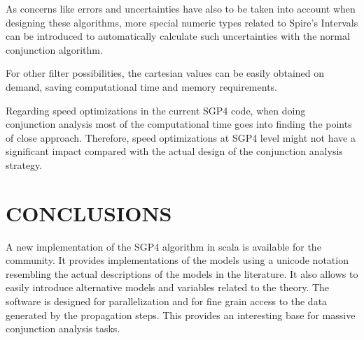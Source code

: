 \documentclass{article}
\begin{document}
As concerns like errors and uncertainties have also to be taken into account when designing these
algorithms, more special numeric types related to Spire's Intervals can be introduced to automatically
calculate such uncertainties with the normal conjunction algorithm.

For other filter possibilities, the cartesian values can be easily obtained on demand, saving computational time and memory requirements.

Regarding speed optimizations in the current SGP4 code, when doing conjunction analysis most of the computational time goes into finding the points of close approach. Therefore, speed optimizations at SGP4 level might not have a significant impact compared with the actual design of the conjunction analysis strategy.


\section{CONCLUSIONS}
\label{sec:conclusions}

A new implementation of the SGP4 algorithm in scala is available for the community.
It provides implementations of the models using a unicode notation resembling the
actual descriptions of the models in the literature. It also allows to easily
introduce alternative models and variables related to the theory.
The software is designed for parallelization and for fine grain access to the data generated by
the propagation steps. This provides an
interesting base for massive conjunction analysis tasks.



\end{document}
